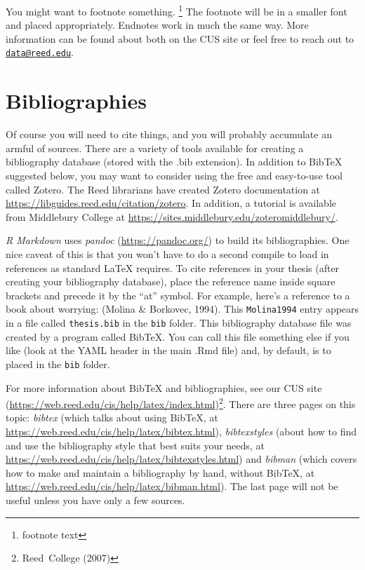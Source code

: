 \documentclass[12pt,twoside]{reedthesis}
\begin{document}
You might want to footnote something. \footnote{footnote text} The footnote will be in a smaller font and placed appropriately. Endnotes work in much the same way. More information can be found about both on the CUS site or feel free to reach out to \href{mailto:data@reed.edu}{\nolinkurl{data@reed.edu}}.

\hypertarget{bibliographies}{%
\section{Bibliographies}\label{bibliographies}}

Of course you will need to cite things, and you will probably accumulate an armful of sources. There are a variety of tools available for creating a bibliography database (stored with the .bib extension). In addition to BibTeX suggested below, you may want to consider using the free and easy-to-use tool called Zotero. The Reed librarians have created Zotero documentation at \url{https://libguides.reed.edu/citation/zotero}. In addition, a tutorial is available from Middlebury College at \url{https://sites.middlebury.edu/zoteromiddlebury/}.

\emph{R Markdown} uses \emph{pandoc} (\url{https://pandoc.org/}) to build its bibliographies. One nice caveat of this is that you won't have to do a second compile to load in references as standard LaTeX requires. To cite references in your thesis (after creating your bibliography database), place the reference name inside square brackets and precede it by the ``at'' symbol. For example, here's a reference to a book about worrying: (Molina \& Borkovec, 1994). This \texttt{Molina1994} entry appears in a file called \texttt{thesis.bib} in the \texttt{bib} folder. This bibliography database file was created by a program called BibTeX. You can call this file something else if you like (look at the YAML header in the main .Rmd file) and, by default, is to placed in the \texttt{bib} folder.

For more information about BibTeX and bibliographies, see our CUS site (\url{https://web.reed.edu/cis/help/latex/index.html})\footnote{Reed~College (2007)}. There are three pages on this topic: \emph{bibtex} (which talks about using BibTeX, at \url{https://web.reed.edu/cis/help/latex/bibtex.html}), \emph{bibtexstyles} (about how to find and use the bibliography style that best suits your needs, at \url{https://web.reed.edu/cis/help/latex/bibtexstyles.html}) and \emph{bibman} (which covers how to make and maintain a bibliography by hand, without BibTeX, at \url{https://web.reed.edu/cis/help/latex/bibman.html}). The last page will not be useful unless you have only a few sources.
\end{document}
